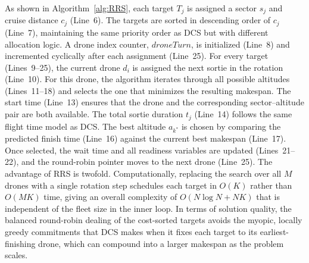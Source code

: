 \documentclass[subscriptcorrection,upint,nolists, varvw,barcolor=Goldenrod3,mathalfa=cal=euler,balance,hyphenate,french]{asmejour} %
\begin{document}
As shown in Algorithm~\ref{alg:RRS}, each target $T_j$ is assigned a sector $s_j$ and cruise distance $c_j$ (Line~6).
The targets are sorted in descending order of $c_j$  (Line~7), maintaining the same priority order as DCS but with different allocation logic. 
A drone index counter, $\mathit{droneTurn}$, is initialized (Line~8) and incremented cyclically after each assignment (Line~25).
For every target (Lines~9–25), the current drone $d_i$ is assigned the next sortie in the rotation (Line~10).
For this drone, the algorithm iterates through all possible altitudes (Lines~11–18) and selects the one that minimizes the resulting makespan.
The start time (Line~13) ensures that the drone and the corresponding sector–altitude pair are both available. The total sortie duration $t_j$ (Line~14) follows the same flight time model as DCS.
The best altitude $a_{k^\ast}$ is chosen by comparing the predicted finish time (Line~16) against the current best makespan (Line~17). 
Once selected, the wait time and all readiness variables are updated (Lines~21–22), and the round-robin pointer moves to the next drone (Line~25).
The advantage of RRS is twofold. Computationally, replacing the search over all $M$ drones with a single rotation step schedules each target in $O(K)$ rather than $O(MK)$ time, giving an overall complexity of $O(N\log N + NK)$ that is independent of the fleet size in the inner loop. In terms of solution quality, the balanced round-robin dealing of the cost-sorted targets avoids the myopic, locally greedy commitments that DCS makes when it fixes each target to its earliest-finishing drone, which can compound into a larger makespan as the problem scales. 
\end{document}
